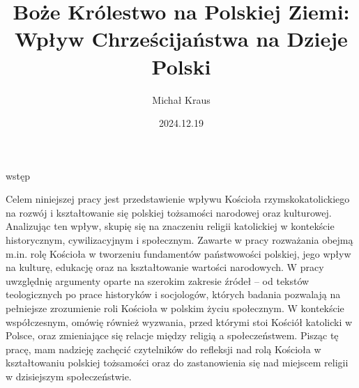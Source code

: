 \documentclass[12pt,a4paper,twoside]{article}
\title{Boże Królestwo na Polskiej Ziemi: Wpływ Chrześcijaństwa na Dzieje Polski}
\author{Michał Kraus}
\date{2024.12.19}
\begin{document}
\maketitle

\begin{center}
    wstęp
\end{center}

Celem niniejszej pracy jest przedstawienie wpływu Kościoła rzymskokatolickiego na rozwój i kształtowanie się polskiej tożsamości narodowej oraz kulturowej. Analizując ten wpływ, skupię się na znaczeniu religii katolickiej w kontekście historycznym, cywilizacyjnym i społecznym. Zawarte w pracy rozważania obejmą m.in. rolę Kościoła w tworzeniu fundamentów państwowości polskiej, jego wpływ na kulturę, edukację oraz na kształtowanie wartości narodowych.
W pracy uwzględnię argumenty oparte na szerokim zakresie źródeł – od tekstów teologicznych po prace historyków i socjologów, których badania pozwalają na pełniejsze zrozumienie roli Kościoła w polskim życiu społecznym. W kontekście współczesnym, omówię również wyzwania, przed którymi stoi Kościół katolicki w Polsce, oraz zmieniające się relacje między religią a społeczeństwem.
Pisząc tę pracę, mam nadzieję zachęcić czytelników do refleksji nad rolą Kościoła w kształtowaniu polskiej tożsamości oraz do zastanowienia się nad miejscem religii w dzisiejszym społeczeństwie.



\tableofcontents





% 

\end{document}
